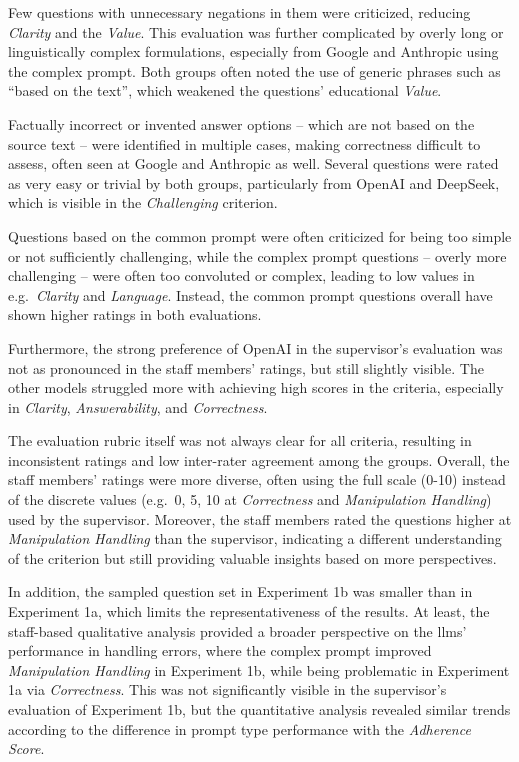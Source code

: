 Few questions with unnecessary negations in them were criticized, reducing \textit{Clarity} and the \textit{Value}. This evaluation was further complicated by overly long or linguistically complex formulations, especially from Google and Anthropic using the complex prompt. Both groups often noted the use of generic phrases such as \enquote{based on the text}, which weakened the questions' educational \textit{Value}.

Factually incorrect or invented answer options -- which are not based on the source text -- were identified in multiple cases, making correctness difficult to assess, often seen at Google and Anthropic as well. Several questions were rated as very easy or trivial by both groups, particularly from OpenAI and DeepSeek, which is visible in the \textit{Challenging} criterion.

Questions based on the common prompt were often criticized for being too simple or not sufficiently challenging, while the complex prompt questions -- overly more challenging -- were often too convoluted or complex, leading to low values in e.g.\ \textit{Clarity} and \textit{Language}. Instead, the common prompt questions overall have shown higher ratings in both evaluations.

Furthermore, the strong preference of OpenAI in the supervisor's evaluation was not as pronounced in the staff members' ratings, but still slightly visible. The other models struggled more with achieving high scores in the criteria, especially in \textit{Clarity}, \textit{Answerability}, and \textit{Correctness}.

The evaluation rubric itself was not always clear for all criteria, resulting in inconsistent ratings and low inter-rater agreement among the groups. Overall, the staff members' ratings were more diverse, often using the full scale (0-10) instead of the discrete values (e.g.\ 0, 5, 10 at \textit{Correctness} and \textit{Manipulation Handling}) used by the supervisor. Moreover, the staff members rated the questions higher at \textit{Manipulation Handling} than the supervisor, indicating a different understanding of the criterion but still providing valuable insights based on more perspectives. 

In addition, the sampled question set in Experiment 1b was smaller than in Experiment 1a, which limits the representativeness of the results. At least, the staff-based qualitative analysis provided a broader perspective on the \acp{llm}' performance in handling errors, where the complex prompt improved \textit{Manipulation Handling} in Experiment 1b, while being problematic in Experiment 1a via \textit{Correctness}. This was not significantly visible in the supervisor's evaluation of Experiment 1b, but the quantitative analysis revealed similar trends according to the difference in prompt type performance with the \textit{Adherence Score}.

